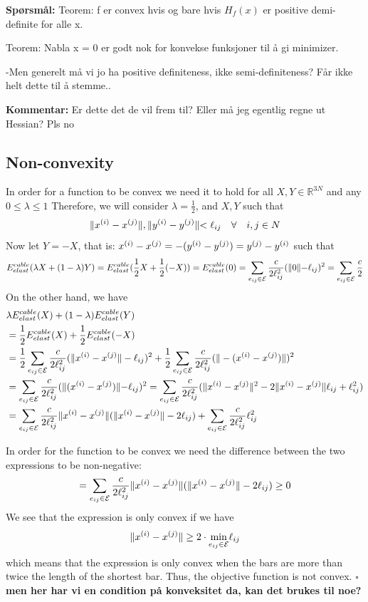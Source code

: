 \textbf{Spørsmål:} 
Teorem: 
f er convex hvis og bare hvis $H_f(x)$ er positive demi-definite for alle x.

Teorem: Nabla x = 0 er godt nok for konvekse funksjoner til å gi minimizer. 

-Men generelt må vi jo ha positive definiteness, ikke semi-definiteness? Får ikke helt dette til å stemme..

\textbf{Kommentar:} Er dette det de vil frem til? Eller må jeg egentlig regne ut Hessian? Pls no

\subsection{Non-convexity}
In order for a function to be convex we need it to hold for all $X,Y \in \mathbb{R}^{3N}$ and any $0\leq \lambda \leq 1$ Therefore, we will consider $\lambda = \frac{1}{2}$, and $X,Y$ such that 
\begin{equation*}
    \rVert x^{(i)}-x^{(j)} \lVert, \rVert y^{(i)}-y^{(j)} \lVert < \ell_{ij} \quad \forall \quad i,j \in N
\end{equation*}
Now let $Y = -X$, that is: $x^{(i)}-x^{(j)} = -(y^{(i)}-y^{(j)}) = y^{(j)}-y^{(i)}$ such that
\begin{equation}
    \label{energyConv1}
    E^{cable}_{elast}(\lambda X + (1-\lambda) Y) = E^{cable}_{elast}(\frac{1}{2}X + \frac{1}{2}(-X)) = E^{cable}_{elast}(0) = \sum\limits_{e_{ij} \in \mathcal{E}} \frac{c}{2 \ell_{ij}^2} ( \rVert 0 \lVert - \ell_{ij})^2 = \sum\limits_{e_{ij} \in \mathcal{E}}\frac{c}{2}
\end{equation}
On the other hand, we have
\begin{equation}
\label{energyConv2}
\begin{aligned}    
    &\lambda E^{cable}_{elast}(X) + (1-\lambda)E^{cable}_{elast}(Y) \\&= \frac{1}{2}E^{cable}_{elast}(X) + \frac{1}{2}E^{cable}_{elast}(-X) \\& 
    = \frac{1}{2}\sum\limits_{e_{ij} \in \mathcal{E}} \frac{c}{2\ell_{ij}^2} (\lVert x^{(i)} - x^{(j)}\rVert - \ell_{ij})^2 + \frac{1}{2} \sum\limits_{e_{ij} \in \mathcal{E}}\frac{c}{2\ell_{ij}^2} (\rVert-(x^{(i)}-x^{(j)})\lVert)^2\\
    &= \sum\limits_{e_{ij} \in \mathcal{E}}\frac{c}{2\ell_{ij}^2}(\rVert(x^{(i)}-x^{(j)})\lVert - \ell_{ij} )^2= \sum\limits_{e_{ij} \in \mathcal{E}}\frac{c}{2\ell_{ij}^2} (\lVert x^{(i)} - x^{(j)}\rVert^2 - 2\lVert x^{(i)} - x^{(j)}\rVert \ell_{ij} + \ell_{ij}^2) \\
    &=\sum\limits_{e_{ij} \in \mathcal{E}}\frac{c}{2\ell_{ij}^2} \lVert x^{(i)} - x^{(j)}\rVert (\lVert x^{(i)} - x^{(j)}\rVert - 2 \ell_{ij}) + \sum\limits_{e_{ij} \in \mathcal{E}}\frac{c}{2\ell_{ij}^2}\ell_{ij}^2
    \end{aligned}
\end{equation}

In order for the function to be convex we need the difference between the two expressions to be non-negative:
\begin{equation}
    =\sum\limits_{e_{ij} \in \mathcal{E}}\frac{c}{2\ell_{ij}^2} \lVert x^{(i)} - x^{(j)}\rVert (\lVert x^{(i)} - x^{(j)}\rVert - 2 \ell_{ij}) \geq 0
\end{equation}
We see that the expression is only convex if we have
$$\lVert x^{(i)} - x^{(j)}\rVert \geq 2 \cdot \underset{{e_{ij} \in \mathcal{E}}}{\text{min}}\ell_{ij}$$
which means that the expression is only convex when the bars are more than twice the length of the shortest bar. Thus, the objective function is not convex. $\square$
\textbf{men her har vi en condition på konveksitet da, kan det brukes til noe?}

